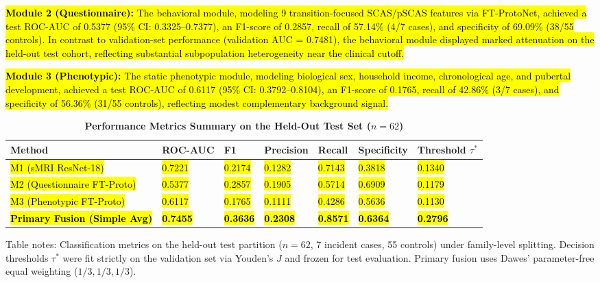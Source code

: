\documentclass[10pt,letterpaper]{article}
\begin{document}
\hl{\textbf{Module 2 (Questionnaire):} The behavioral module, modeling 9 transition-focused SCAS/pSCAS features via FT-ProtoNet, achieved a test ROC-AUC of 0.5377 (95\% CI: 0.3325--0.7377), an F1-score of 0.2857, recall of 57.14\% (4/7 cases), and specificity of 69.09\% (38/55 controls). In contrast to validation-set performance (validation AUC = 0.7481), the behavioral module displayed marked attenuation on the held-out test cohort, reflecting substantial subpopulation heterogeneity near the clinical cutoff.}

\hl{\textbf{Module 3 (Phenotypic):} The static phenotypic module, modeling biological sex, household income, chronological age, and pubertal development, achieved a test ROC-AUC of 0.6117 (95\% CI: 0.3792--0.8104), an F1-score of 0.1765, recall of 42.86\% (3/7 cases), and specificity of 56.36\% (31/55 controls), reflecting modest complementary background signal.}

\begin{table}[!t]
\begin{adjustwidth}{-2.25in}{0in}
\centering
\caption{\textbf{Performance Metrics Summary on the Held-Out Test Set ($n=62$)}}
\label{tab:performance_summary}
\footnotesize
\renewcommand{\arraystretch}{1.15}
\begin{tabular}{|p{3.2cm}|p{1.8cm}|p{1.6cm}|p{1.8cm}|p{1.8cm}|p{1.8cm}|p{1.8cm}|}
\hline
\textbf{Method} & \textbf{ROC-AUC} & \textbf{F1} & \textbf{Precision} & \textbf{Recall} & \textbf{Specificity} & \textbf{Threshold $\tau^*$} \\
\hline
\hl{M1 (sMRI ResNet-18)} & \hl{0.7221} & \hl{0.2174} & \hl{0.1282} & \hl{0.7143} & \hl{0.3818} & \hl{0.1340} \\
\hline
\hl{M2 (Questionnaire FT-Proto)} & \hl{0.5377} & \hl{0.2857} & \hl{0.1905} & \hl{0.5714} & \hl{0.6909} & \hl{0.1179} \\
\hline
\hl{M3 (Phenotypic FT-Proto)} & \hl{0.6117} & \hl{0.1765} & \hl{0.1111} & \hl{0.4286} & \hl{0.5636} & \hl{0.1130} \\
\hline
\textbf{\hl{Primary Fusion (Simple Avg)}} & \textbf{\hl{0.7455}} & \textbf{\hl{0.3636}} & \textbf{\hl{0.2308}} & \textbf{\hl{0.8571}} & \textbf{\hl{0.6364}} & \textbf{\hl{0.2796}} \\
\hline
\end{tabular}
\begin{flushleft}
Table notes: Classification metrics on the held-out test partition ($n=62$, 7 incident cases, 55 controls) under family-level splitting. Decision thresholds $\tau^*$ were fit strictly on the validation set via Youden's $J$ and frozen for test evaluation. Primary fusion uses Dawes' parameter-free equal weighting ($1/3, 1/3, 1/3$).
\end{flushleft}
\end{adjustwidth}
\end{table}
\end{document}
